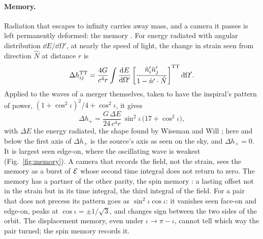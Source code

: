 \paragraph{Memory.} Radiation that escapes to infinity
carries away mass, and a camera it passes is left permanently deformed: the
memory \cite{ZeldovichPolnarev1974,Christodoulou1991,Thorne1992}. For energy radiated with angular
distribution $\dd E/\dd\Omega'$, at nearly the speed of light, the change in
strain seen from direction $\hat N$ at distance $r$ is
\cite{Thorne1992,Epstein1978}
\begin{equation}\label{eq:memory}
\Delta h_{ij}^{\mathrm{TT}} = \frac{4G}{c^4 r}\int \frac{\mathrm{d} E}{\mathrm{d}\Omega'}
\left[\frac{\hat n'_i \hat n'_j}{1 - \hat n'\cdot\hat N}\right]^{\mathrm{TT}}\mathrm{d}\Omega' .
\end{equation}
Applied to the waves of a merger themselves, taken to have the inspiral's pattern of power,
$(1+\cos^2\iota)^2/4 + \cos^2\iota$, it gives
\begin{equation}\label{eq:merger-memory}
\Delta h_+ = \frac{G\,\Delta E}{24\,c^4 r}\,\sin^2\iota\,\bigl(17 + \cos^2\iota\bigr),
\end{equation}
with $\Delta E$ the energy radiated, the shape found by Wiseman and Will \cite{WisemanWill1991,Favata2009}; here and below the first axis of $\Delta h_+$ is the source's axis as seen on the sky, and $\Delta h_\times = 0$. It is largest
seen edge-on, where the oscillating wave is weakest (Fig.~\ref{fig:memory}).
A camera that records the field, not the strain, sees the memory as a burst of
$\mathcal{E}$ whose second time integral does not return to zero. The memory has a partner
of the other parity, the spin memory \cite{PasterskiStromingerZhiboedov2016,Nichols2017}:
a lasting offset not in the strain but in its time integral, the third
integral of the field. For a pair that does not precess its pattern goes as
$\sin^2\iota\cos\iota$: it vanishes seen face-on and edge-on, peaks at
$\cos\iota = \pm1/\sqrt3$, and changes sign between the two sides of the
orbit. The displacement memory, even under $\iota \to \pi - \iota$, cannot tell
which way the pair turned; the spin memory records it.

